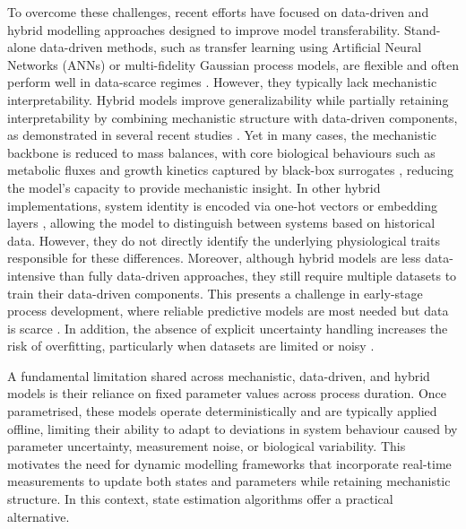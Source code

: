 To overcome these challenges, recent efforts have focused on data-driven and hybrid modelling approaches designed to improve model transferability. Stand-alone data-driven methods, such as transfer learning using Artificial Neural Networks (ANNs) or multi-fidelity Gaussian process models, are flexible and often perform well in data-scarce regimes \cite{KarimiAlavijeh2024ADevelopments, Rogers2022AData, Sun2022Multi-fidelityData, Martens2025HolisticOptimization}. However, they typically lack mechanistic interpretability. Hybrid models improve generalizability while partially retaining interpretability by combining mechanistic structure with data-driven components, as demonstrated in several recent studies \cite{Narayanan2019AProteins, Bayer2021ModelExperiments, Bayer2023ComparisonPaths, Pinto2023HybridNetworks, Ramos2024DeepEquations, Cruz-Bournazou2022HybridCultures}. Yet in many cases, the mechanistic backbone is reduced to mass balances, with core biological behaviours such as metabolic fluxes and growth kinetics captured by black-box surrogates \cite{Narayanan2019AProteins, Tsopanoglou2021MovingBioprocesses}, reducing the model's capacity to provide mechanistic insight. In other hybrid implementations, system identity is encoded via one-hot vectors \cite{Helleckes2024NovelBioprocesses} or embedding layers \cite{Hutter2021KnowledgeVectors}, allowing the model to distinguish between systems based on historical data. However, they do not directly identify the underlying physiological traits responsible for these differences. Moreover, although hybrid models are less data-intensive than fully data-driven approaches, they still require multiple datasets to train their data-driven components. This presents a challenge in early-stage process development, where reliable predictive models are most needed but data is scarce \cite{Lu2024Multi-cell-lineModels}. In addition, the absence of explicit uncertainty handling increases the risk of overfitting, particularly when datasets are limited or noisy \cite{Schweidtmann2024AMethodologies}. 

A fundamental limitation shared across mechanistic, data-driven, and hybrid models is their reliance on fixed parameter values across process duration. Once parametrised, these models operate deterministically and are typically applied offline, limiting their ability to adapt to deviations in system behaviour caused by parameter uncertainty, measurement noise, or biological variability. This motivates the need for dynamic modelling frameworks that incorporate real-time measurements to update both states and parameters while retaining mechanistic structure. In this context, state estimation algorithms offer a practical alternative.

